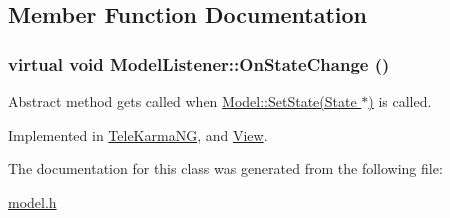 \subsection{Member Function Documentation}
\hypertarget{classModelListener_63070a6f75480904846b7cfc6389aa4c}{
\subsubsection[{OnStateChange}]{\setlength{\rightskip}{0pt plus 5cm}virtual void ModelListener::OnStateChange ()}}
\label{classModelListener_63070a6f75480904846b7cfc6389aa4c}


Abstract method gets called when \hyperlink{classModel_8b2d324213cf67b2e139144a25c6e3c3}{Model::SetState(State $\ast$)} is called. 



Implemented in \hyperlink{classTeleKarmaNG_ce1e8d62f3e1d586e2aa5d2012c9a766}{TeleKarmaNG}, and \hyperlink{classView_92a0d9fd64b52e7f85d45c46c28a6546}{View}.

The documentation for this class was generated from the following file:\begin{CompactItemize}
\item 
\hyperlink{model_8h}{model.h}\end{CompactItemize}
